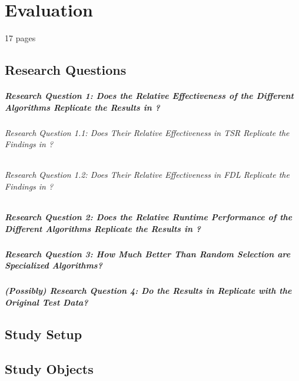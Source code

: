 
\chapter{Evaluation}\label{chapter:evaluation}

17 pages

\section{Research Questions}

\paragraph{Research Question 1: Does the Relative Effectiveness of the Different Algorithms Replicate the Results in \cite{cruciani2019scalable}?}

\subparagraph{Research Question 1.1: Does Their Relative Effectiveness in TSR Replicate the Findings
in \cite{cruciani2019scalable}?}

\subparagraph{Research Question 1.2: Does Their Relative Effectiveness in FDL Replicate the Findings in \cite{cruciani2019scalable}?}

\paragraph{Research Question 2: Does the Relative Runtime Performance of the Different Algorithms Replicate the Results in \cite{cruciani2019scalable}?}

\paragraph{Research Question 3: How Much Better Than Random Selection are Specialized Algorithms?}

\paragraph{(Possibly) Research Question 4: Do the Results in \cite{cruciani2019scalable} Replicate with the Original Test Data?}

\section{Study Setup}

\section{Study Objects}

